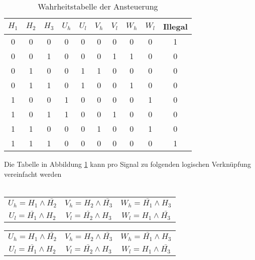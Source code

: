         \begin{table}[h!]
            \begin{tabular}{ccc||cc|cc|cc||c}
                 $H_1$ & $H_2$ & $H_3$ & $U_h$ & $U_l$ & $V_h$ & $V_l$ & $W_h$ & $W_l$ & Illegal\\
            \hline 0   &   0   &   0   &   0   &   0   &   0   &   0   &   0   &   0   &   1\\
                   0   &   0   &   1   &   0   &   0   &   0   &   1   &   1   &   0   &   0\\
                   0   &   1   &   0   &   0   &   1   &   1   &   0   &   0   &   0   &   0\\
                   0   &   1   &   1   &   0   &   1   &   0   &   0   &   1   &   0   &   0\\
                   1   &   0   &   0   &   1   &   0   &   0   &   0   &   0   &   1   &   0\\
                   1   &   0   &   1   &   1   &   0   &   0   &   1   &   0   &   0   &   0\\
                   1   &   1   &   0   &   0   &   0   &   1   &   0   &   0   &   1   &   0\\
                   1   &   1   &   1   &   0   &   0   &   0   &   0   &   0   &   0   &   1\\
            \end{tabular}
           	\centering
           	\caption{Wahrheitstabelle der Ansteuerung} 
            \label{abb:WahrheitstabelleAnsteuerung}
        \end{table}
        \parindent 0pt Die Tabelle in Abbildung 
        \ref{abb:WahrheitstabelleAnsteuerung} kann pro Signal zu folgenden 
        logischen Verknüpfung vereinfacht werden\\
        \\
        \ifSTANDALONE
        \begin{table}
            \centering
            \begin{tabular}{ccc}
                $U_h = H_1 \wedge \bar{H_2}$ & $V_h = H_2 \wedge \bar{H_3}$ & $W_h = \bar{H_1} \wedge H_3$\\
                $U_l = \bar{H_1} \wedge H_2$ & $V_l = \bar{H_2} \wedge H_3$ & $W_l = H_1 \wedge \bar{H_3}$
            \end{tabular}
        \end{table}
        \fi
        \ifEMBED
        \begin{tabular}{ccc}
            $U_h = H_1 \wedge \bar{H_2}$ & $V_h = H_2 \wedge \bar{H_3}$ & $W_h = \bar{H_1} \wedge H_3$\\
            $U_l = \bar{H_1} \wedge H_2$ & $V_l = \bar{H_2} \wedge H_3$ & $W_l = H_1 \wedge \bar{H_3}$
        \end{tabular}
        \fi
    \ifSTANDALONE

